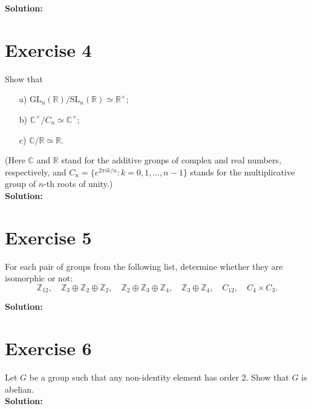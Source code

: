 \documentclass{article}
\begin{document}
\textbf{Solution:} \\



\newpage

\section*{Exercise 4}
Show that
\begin{itemize}
\item[a)] $\text{GL}_n(\mathbb{R})/\text{SL}_n(\mathbb{R}) \simeq \mathbb{R}^\times$;
\item[b)] $\mathbb{C}^\times/C_n \simeq \mathbb{C}^\times$;
\item[c)] $\mathbb{C}/\mathbb{R} \simeq \mathbb{R}$.
\end{itemize}
(Here $\mathbb{C}$ and $\mathbb{R}$ stand for the additive groups of complex and real numbers, respectively, and $C_n = \{e^{2\pi i k/n}: k = 0,1,...,n-1\}$ stands for the multiplicative group of $n$-th roots of unity.) \\

\textbf{Solution:} \\



\newpage

\section*{Exercise 5}
For each pair of groups from the following list, determine whether they are isomorphic or not:
\[ \mathbb{Z}_{12}, \quad \mathbb{Z}_3 \oplus \mathbb{Z}_2 \oplus \mathbb{Z}_2, \quad \mathbb{Z}_2 \oplus \mathbb{Z}_3 \oplus \mathbb{Z}_4, \quad \mathbb{Z}_3 \oplus \mathbb{Z}_4, \quad C_{12}, \quad C_4 \times C_3. \]

\textbf{Solution:} \\



\newpage

\section*{Exercise 6}
Let $G$ be a group such that any non-identity element has order 2. Show that $G$ is abelian. \\

\textbf{Solution:} \\
\end{document}
